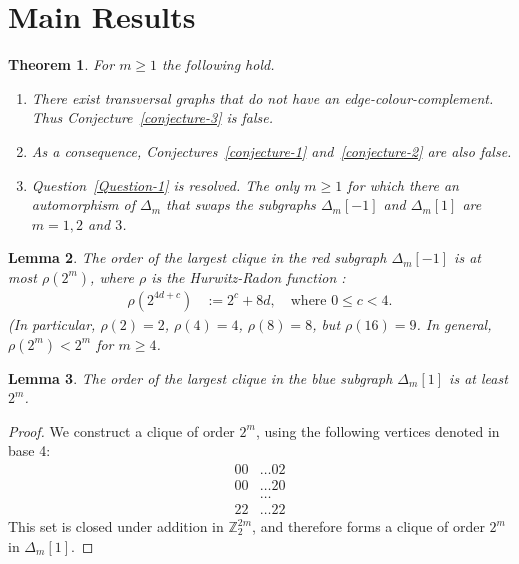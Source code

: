 \documentclass[12pt,a4paper]{article}
\newcommand{\mb}[1]{\mathbb{#1}}
\newcommand{\Z}{\mb{Z}}
\newtheorem{Lemma}{Lemma}
\newtheorem{Theorem}[Lemma]{Theorem}
\begin{document}
\section{Main Results}
\begin{Theorem}
\label{Conjectures-are-false-theorem}
For $m \geqslant 1$ the following hold.
\begin{enumerate}
 \item 
There exist transversal graphs that do not have an edge-colour-complement.
Thus Conjecture~\ref{conjecture-3} is false.
\item
As a consequence, Conjectures~\ref{conjecture-1} and~\ref{conjecture-2} are also false.
\item
Question~\ref{Question-1} is resolved.
The only $m \geqslant 1$ for which there an automorphism of $\varDelta_m$ that swaps the subgraphs $\varDelta_m[-1]$ and $\varDelta_m[1]$
are $m=1,2$ and $3$.
\end{enumerate}

\end{Theorem}

\begin{Lemma}
\label{Red-clique-lemma}
The order of the largest clique in the red subgraph $\varDelta_m[-1]$ is at most $\rho(2^m)$,
where $\rho$ is the Hurwitz-Radon function \cite{GerP74,Hur22,Rad22}:
\begin{align*}
\rho(2^{4 d + c}) &:= 2^c + 8 d, \quad \text{where~} 0 \leqslant c < 4.
\end{align*}
(In particular, $\rho(2)=2$, $\rho(4)=4$, $\rho(8)=8$, but $\rho(16)=9$. 
In general, $\rho(2^m) < 2^m$ for $m \geqslant 4$.
\end{Lemma}

\begin{Lemma}
\label{Blue-clique-lemma}
The order of the largest clique in the blue subgraph $\varDelta_m[1]$ is at least $2^m$.
\end{Lemma}
\begin{proof}
We construct a clique of order $2^m$, using the following vertices denoted in base 4:
\begin{align*}
00 &\ldots 02
\\
00 &\ldots 20
\\
&\ldots
\\
22 &\ldots 22
\end{align*}
This set is closed under addition in $\Z_2^{2 m}$,
and therefore forms a clique of order $2^m$ in $\varDelta_m[1]$.
\end{proof}
\end{document}
